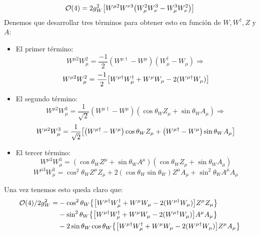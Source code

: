 \begin{itemize}
	\begin{equation}
		\Ocal(4) = 2g_W^2 \bqty{W^{\mu  2} W^{\nu 3} \pqty{W_{\mu}^2 W_{\nu}^3-W_{\mu}^3 W_{\nu}^2}}
	\end{equation}
	Denemos que desarrollar tres términos para obtener esto en función de $W,W^\dagger,Z$ y $A$: 
	\begin{itemize}
		\item El primer término: 
		\begin{equation}
			W^{\mu  2} W_{\mu}^2 =  \frac{-1}{2} (W^{\mu \dagger} - W^{\mu})(W_{\mu}^{\dagger} - W_{\mu}) \Longrightarrow
  		\end{equation}
		\begin{equation}
			W^{\mu  2} W_{\mu}^2 =  \frac{-1}{2} \bqty{W^{\mu \dagger} W_{\mu}^{\dagger} + W^{\mu } W_{\mu} -  2(W^{\mu \dagger} W_{\mu})  }
		\end{equation}
		\item El segundo término: 
		\begin{equation}
			W^{\mu  2} W_{\mu}^3 =  \frac{1}{\sqrt{2}} (W^{\mu \dagger} - W^{\mu})( \cos \theta_W Z_{\mu} + \sin \theta_W A_\mu) \Longrightarrow
  		\end{equation}
		\begin{equation}
			W^{\mu  2} W_{\mu}^3 =  \frac{1}{\sqrt{2}} \bqty{\pqty{W^{\mu \dagger}-W^{\mu}} \cos \theta_W Z_\mu + \pqty{W^{\mu \dagger} - W^{\mu}} \sin \theta_W A_\mu  }
		\end{equation}
		\item El tercer término: 
		\begin{equation}
			W^{\mu  3} W_{\mu}^3 =   (\cos  \theta_W Z^{\mu } + \sin \theta_W A^{\mu})(\cos  \theta_W Z_{\mu } + \sin \theta_W A_{\mu})
  		\end{equation}
		\begin{equation}
			W^{\mu  3} W_{\mu}^3=  \cos^2  \theta_W  Z^\mu Z_\mu + 2 (\cos  \theta_W \sin \theta_W ) Z^\mu A_\mu + \sin^2 \theta_W  A^\mu A_\mu
		\end{equation}
	\end{itemize}
	Una vez tenemos esto queda claro que: 
	\begin{align}
		\Ocal(4)/2g_W^2 = &  - \cos^2 \theta_W \Bqty{\bqty{W^{\mu \dagger} W_{\mu}^{\dagger} + W^{\mu } W_{\mu} -  2(W^{\mu \dagger} W_{\mu})  }Z^\mu Z_\mu} \nonumber \\
		& -  \sin^2 \theta_W \Bqty{\bqty{W^{\mu \dagger} W_{\mu}^{\dagger} + W^{\mu } W_{\mu} -  2(W^{\mu \dagger} W_{\mu})  }A^\mu A_\mu} \nonumber \\ 
		& - 2 \sin \theta_W \cos \theta_W \Bqty{\bqty{W^{\mu \dagger} W_{\mu}^{\dagger} + W^{\mu } W_{\mu} -  2(W^{\mu \dagger} W_{\mu})  }Z^\mu A_\mu} 
	\end{align}


\end{itemize}
